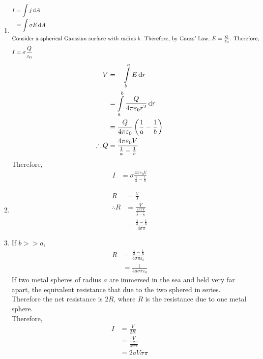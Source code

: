 \documentclass[fleqn, a4paper, 11pt, oneside]{amsart}
\theoremstyle{definition}
\theoremstyle{theorem}
\begin{document}
\begin{solution}
	\begin{enumerate}[leftmargin = *]
		\item
			\begin{align*}
				I & = \int j \dif A        \\
                                  & = \int \sigma E \dif A \\
				\intertext{Consider a spherical Gaussian surface with radius $b$. Therefore, by Gauss' Law, $E = \frac{Q}{\varepsilon_0}$. Therefore,}
				I & = \sigma \frac{Q}{\varepsilon_0}
			\end{align*}
			\begin{align*}
				V            & = -\int\limits_{b}^{a} E \dif r                                          \\
                                             & = \int\limits_{a}^{b} \frac{Q}{4 \pi \varepsilon_0 r^2} \dif r           \\
                                             & = \frac{Q}{4 \pi \varepsilon_0} \left( \frac{1}{a} - \frac{1}{b} \right) \\
				\therefore Q & = \frac{4 \pi \varepsilon_0 V}{\frac{1}{a} - \frac{1}{b}}
			\end{align*}
			Therefore,
			\begin{align*}
				I & = \sigma \frac{4 \pi \varepsilon_0 V}{\frac{1}{a} - \frac{1}{b}}
			\end{align*}
		\item
			\begin{align*}
				R            & = \frac{V}{I}                                                \\
				\therefore R & = \frac{V}{\frac{4 \sigma \pi V}{\frac{1}{a} - \frac{1}{b}}} \\
                                             & = \frac{\frac{1}{a} - \frac{1}{b}}{4 \sigma \pi}
			\end{align*}
		\item
			If $b >> a$,
			\begin{align*}
				R & = \frac{\frac{1}{a} - \frac{1}{b}}{4 \sigma \pi \varepsilon_0} \\
                                  & = \frac{1}{4 a \sigma \pi \varepsilon_0}
			\end{align*}
			If two metal spheres of radius $a$ are immersed in the sea and held very far apart, the equivalent resistance that due to the two sphered in series.
			Therefore the net resistance is $2 R$, where $R$ is the resistance due to one metal sphere.\\
			Therefore,
			\begin{align*}
				I & = \frac{V}{2 R}                      \\
                                  & = \frac{V}{\frac{2}{4 a \sigma \pi}} \\
                                  & = 2 a V \sigma \pi
			\end{align*}
	\end{enumerate}
\end{solution}
\end{document}
